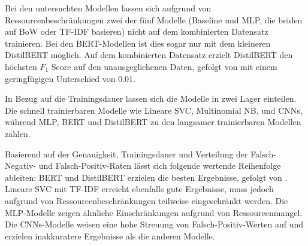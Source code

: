 Bei den untersuchten Modellen lassen sich aufgrund von Ressourcenbeschränkungen zwei der fünf Modelle (Baseline und \ac{MLP}, die beiden auf \ac{BoW} oder \ac{TF-IDF} basieren) nicht auf dem kombinierten Datensatz trainieren. Bei den BERT-Modellen ist dies sogar nur mit dem kleineren DistilBERT möglich. Auf dem kombinierten Datensatz erzielt DistilBERT den höchsten \(F_1\) Score auf den unausgeglichenen Daten, gefolgt von \ft mit einem geringfügigen Unterschied von \num{0.01}.

In Bezug auf die Trainingsdauer lassen sich die Modelle in zwei Lager einteilen. Die schnell trainierbaren Modelle wie Lineare \ac{SVC}, Multinomial \ac{NB}, \ft und \acp{CNN}, während \ac{MLP}, \ac{BERT} und DistilBERT zu den langsamer trainierbaren Modellen zählen.

Basierend auf der Genauigkeit, Trainingsdauer und Verteilung der Falsch-Negativ- und Falsch-Positiv-Raten lässt sich folgende wertende Reihenfolge ableiten: \ac{BERT} und DistilBERT erzielen die besten Ergebnisse, gefolgt von \ft. Lineare \ac{SVC} mit \ac{TF-IDF} erreicht ebenfalls gute Ergebnisse, muss jedoch aufgrund von Ressourcenbeschränkungen teilweise eingeschränkt werden. Die \ac{MLP}-Modelle zeigen ähnliche Einschränkungen aufgrund von Ressourcenmangel. Die \acp{CNN}-Modelle weisen eine hohe Streuung von Falsch-Positiv-Werten auf und erzielen inakkuratere Ergebnisse als die anderen Modelle.
